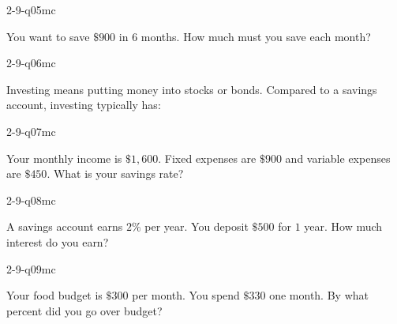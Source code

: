 \begin{practiceQuestion}{2-9-q05}{mc}
\begin{questionText}
You want to save $\$900$ in $6$ months. How much must you save each month?
\end{questionText}
\end{practiceQuestion}

\begin{practiceQuestion}{2-9-q06}{mc}
\begin{questionText}
Investing means putting money into stocks or bonds. Compared to a savings account, investing typically has:
\end{questionText}
\end{practiceQuestion}

\begin{practiceQuestion}{2-9-q07}{mc}
\begin{questionText}
Your monthly income is $\$1{,}600$. Fixed expenses are $\$900$ and variable expenses are $\$450$. What is your savings rate?
\end{questionText}
\end{practiceQuestion}

\begin{practiceQuestion}{2-9-q08}{mc}
\begin{questionText}
A savings account earns $2\%$ per year. You deposit $\$500$ for $1$ year. How much interest do you earn?
\end{questionText}
\end{practiceQuestion}

\begin{practiceQuestion}{2-9-q09}{mc}
\begin{questionText}
Your food budget is $\$300$ per month. You spend $\$330$ one month. By what percent did you go over budget?
\end{questionText}
\end{practiceQuestion}

